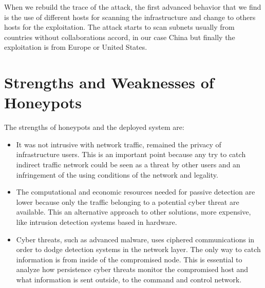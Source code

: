 \documentclass[a4paper]{llncs}
\begin{document}
When we rebuild the trace of the attack, the first advanced behavior that we find is the use of different hosts for scanning the infrastructure and change to others hosts for the exploitation. The attack starts to scan subnets usually from countries without collaborations accord, in our case China but finally the exploitation is from Europe or United States.

\section{Strengths and Weaknesses of Honeypots}
\label{sec:Strengths&Weaknesses}
The strengths of honeypots and the deployed system are:
\begin{itemize}
	\item It was not intrusive with network traffic, remained the privacy of infrastructure users. This is an important point because any try to catch indirect traffic network could be seen as a threat by other users and an infringement of the using conditions of the network and legality.
	\item The computational and economic resources needed for passive detection are lower because only the traffic belonging to a potential cyber threat are available. This an alternative approach to other solutions, more expensive, like intrusion detection systems based in hardware.
	\item Cyber threats, such as advanced malware, uses ciphered communications in order to dodge detection systems in the network layer. The only way to catch information is from inside of the compromised node. This is essential to analyze how persistence cyber threats monitor the compromised host and what information is sent outside, to the command and control network.
\end{itemize}
\end{document}
